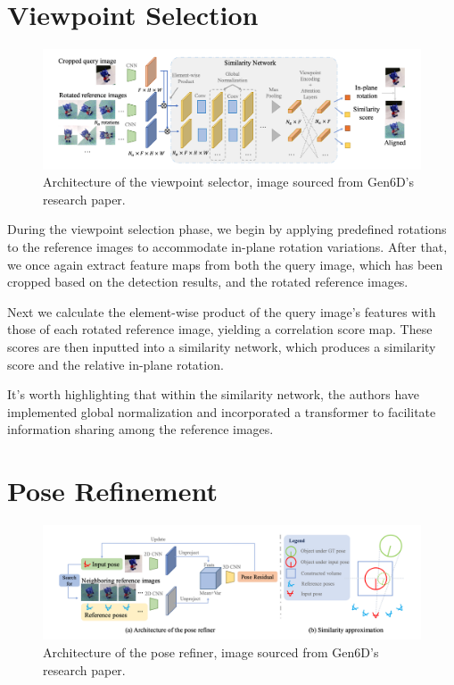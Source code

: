 \bigskip


\section{Viewpoint Selection}

\begin{figure}[ht]
  \centering
  \includegraphics[width=\textwidth]{data/gen6d3.png}
  \caption{Architecture of the viewpoint selector, image sourced from Gen6D's \\ research paper.}
  \label{fig:fig2}
\end{figure}

\bigskip

During the viewpoint selection phase, we begin by applying predefined rotations to the reference images to accommodate in-plane rotation variations. After that, we once again extract feature maps from both the query image, which has been cropped based on the detection results, and the rotated reference images.

Next we calculate the element-wise product of the query image's features with those of each rotated reference image, yielding a correlation score map. These scores are then inputted into a similarity network, which produces a similarity score and the relative in-plane rotation.

It's worth highlighting that within the similarity network, the authors have implemented global normalization and incorporated a transformer to facilitate information sharing among the reference images.

\bigskip


\section{Pose Refinement}

\begin{figure}[ht]
  \centering
  \includegraphics[width=\textwidth]{data/gen6d4.png}
  \caption{Architecture of the pose refiner, image sourced from Gen6D's research paper.}
  \label{fig:fig3}
\end{figure}

